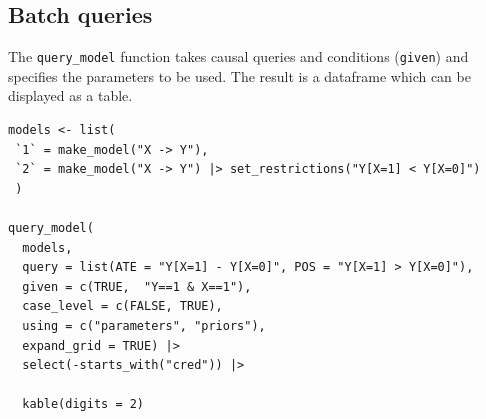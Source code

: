 \documentclass[
  article]{jss}
\begin{document}
\hypertarget{batch-queries}{%
\subsection{Batch queries}\label{batch-queries}}

The \texttt{query\_model} function takes causal queries and conditions
(\texttt{given}) and specifies the parameters to be used. The result is
a dataframe which can be displayed as a table.

\begin{verbatim}
models <- list(
 `1` = make_model("X -> Y"),
 `2` = make_model("X -> Y") |> set_restrictions("Y[X=1] < Y[X=0]")
 )

query_model(
  models,
  query = list(ATE = "Y[X=1] - Y[X=0]", POS = "Y[X=1] > Y[X=0]"),
  given = c(TRUE,  "Y==1 & X==1"),
  case_level = c(FALSE, TRUE),
  using = c("parameters", "priors"),
  expand_grid = TRUE) |>
  select(-starts_with("cred")) |>
  
  kable(digits = 2)
\end{verbatim}
\end{document}
